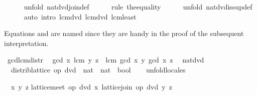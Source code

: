 \begin{isabellebody}
\ \ \ \ \isamarkupfalse%
\ {\isacharparenleft}unfold\ nat{\isacharunderscore}dvd{\isachardot}join{\isacharunderscore}def{\isacharparenright}\isanewline
\ \ \ \ \isamarkupfalse%
\ {\isacharparenleft}rule\ the{\isacharunderscore}equality{\isacharparenright}\isanewline
\ \ \ \ \isamarkupfalse%
\ {\isacharparenleft}unfold\ nat{\isacharunderscore}dvd{\isachardot}is{\isacharunderscore}sup{\isacharunderscore}def{\isacharparenright}\isanewline
\ \ \ \ \isamarkupfalse%
\ {\isacharparenleft}auto\ intro{\isacharcolon}\ lcm{\isacharunderscore}dvd{}\ lcm{\isacharunderscore}dvd{}\ lcm{\isacharunderscore}least{\isacharparenright}\isanewline
{}\isamarkupfalse%
%
\endisatagproof
{\isafoldproof}%
%
\isadelimproof
%
\endisadelimproof
%
\begin{isamarkuptext}%
Equations  and  are named since they are handy in the proof of
  the subsequent interpretation.%
\end{isamarkuptext}%
\isamarkuptrue%
%
\isadeliminvisible
%
\endisadeliminvisible
%
\isataginvisible
{}\isamarkupfalse%
\ gcd{\isacharunderscore}lcm{\isacharunderscore}distr{\isacharcolon}\isanewline
\ \ {\isachardoublequoteopen}gcd\ x\ {\isacharparenleft}lcm\ y\ z{\isacharparenright}\ {\isacharequal}\ lcm\ {\isacharparenleft}gcd\ x\ y{\isacharparenright}\ {\isacharparenleft}gcd\ x\ z{\isacharparenright}{\isachardoublequoteclose}\ \isamarkupfalse%
%
\endisataginvisible
{\isafoldinvisible}%
%
\isadeliminvisible
%
\endisadeliminvisible
\isanewline
%
\isadelimvisible
\isanewline
%
\endisadelimvisible
%
\isatagvisible
{}\isamarkupfalse%
\ nat{\isacharunderscore}dvd{\isacharcolon}\isanewline
\ \ distrib{\isacharunderscore}lattice\ {\isachardoublequoteopen}op\ dvd\ {\isacharcolon}{\isacharcolon}\ nat\ {\isasymRightarrow}\ nat\ {\isasymRightarrow}\ bool{\isachardoublequoteclose}\isanewline
\ \ \isamarkupfalse%
\ unfold{\isacharunderscore}locales%
\begin{isamarkuptxt}%
\begin{isabelle}%
\ {}{\isachardot}\ {\isasymAnd}x\ y\ z{\isachardot}\isanewline
{}lattice{\isachardot}meet\ op\ dvd\ x\ {\isacharparenleft}lattice{\isachardot}join\ op\ dvd\ y\ z{\isacharparenright}\ {\isacharequal}\isanewline

\end{isabelle}
\end{isamarkuptxt}
\end{isabellebody}
